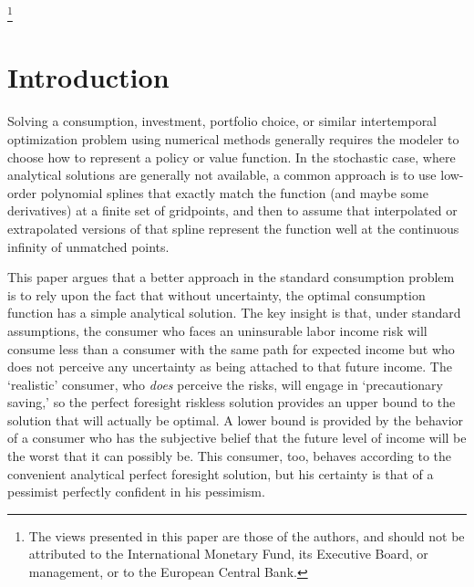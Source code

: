 \documentclass[titlepage, headings=optiontotocandhead]{econark}
\begin{document}
\begin{authorsinfo}
\end{authorsinfo}

\thanks{The views presented in this paper are those of the authors, and should not be attributed to the International Monetary Fund, its Executive Board, or management, or to the European Central Bank.}

\thispagestyle{empty}


\pagebreak\newpage


\hypertarget{introduction}{}
\section{Introduction}\label{sec:Intro}

Solving a consumption, investment, portfolio choice, or similar intertemporal optimization problem using numerical methods generally requires the modeler to choose how to represent a policy or value function.
In the stochastic case, where analytical solutions are generally not available, a common approach is to use low-order polynomial splines that exactly match the function (and maybe some derivatives) at a finite set of gridpoints, and then to assume that interpolated or extrapolated versions of that spline represent the function well at the continuous infinity of unmatched points.

This paper argues that a better approach in the standard consumption problem is to rely upon the fact that without uncertainty, the optimal consumption function has a simple analytical solution.
The key insight is that, under standard assumptions, the consumer who faces an uninsurable labor income risk will consume less than a consumer with the same path for expected income but who does not perceive any uncertainty as being attached to that future income.
The `realistic' consumer, who \textit{does} perceive the risks, will engage in `precautionary saving,' so the perfect foresight riskless solution provides an upper bound to the solution that will actually be optimal.
A lower bound is provided by the behavior of a consumer who has the subjective belief that the future level of income will be the worst that it can possibly be.
This consumer, too, behaves according to the convenient analytical perfect foresight solution, but his certainty is that of a pessimist perfectly confident in his pessimism.
\end{document}
